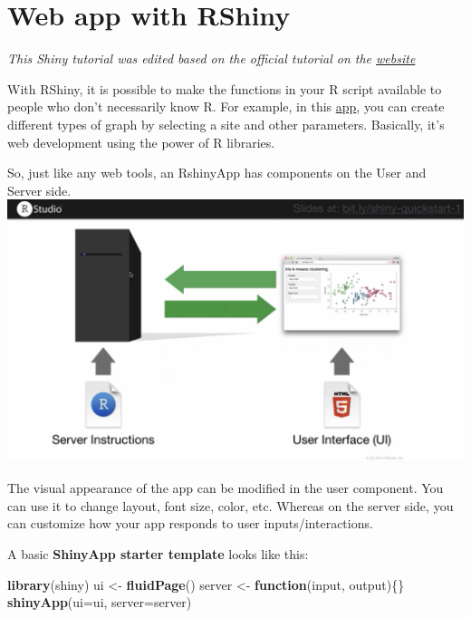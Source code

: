 \documentclass[
]{book}
\newenvironment{Shaded}{\begin{snugshade}}{\end{snugshade}}
\newcommand{\ControlFlowTok}[1]{\textcolor[rgb]{0.13,0.29,0.53}{\textbf{#1}}}
\newcommand{\DataTypeTok}[1]{\textcolor[rgb]{0.13,0.29,0.53}{#1}}
\newcommand{\KeywordTok}[1]{\textcolor[rgb]{0.13,0.29,0.53}{\textbf{#1}}}
\newcommand{\NormalTok}[1]{#1}
\newcommand{\StringTok}[1]{\textcolor[rgb]{0.31,0.60,0.02}{#1}}
\begin{document}
\hypertarget{htmlwidget-03897aacea723c0335c0}{}

\hypertarget{web-app-with-rshiny}{%
\section{Web app with RShiny}\label{web-app-with-rshiny}}

\emph{This Shiny tutorial was edited based on the official tutorial on the \href{https://shiny.rstudio.com/tutorial/}{website}}

With RShiny, it is possible to make the functions in your R script available to people who don't necessarily know R. For example, in this \href{https://udwq.shinyapps.io/lakeprofiledashboard/}{app}, you can create different types of graph by selecting a site and other parameters. Basically, it's web development using the power of R libraries.

So, just like any web tools, an RshinyApp has components on the User and Server side.
\includegraphics{images/appStructure.png}

The visual appearance of the app can be modified in the user component. You can use it to change layout, font size, color, etc. Whereas on the server side, you can customize how your app responds to user inputs/interactions.

A basic \textbf{ShinyApp starter template} looks like this:

\begin{Shaded}
\begin{Highlighting}[]
\KeywordTok{library}\NormalTok{(shiny)}
\NormalTok{ui \textless{}{-}}\StringTok{ }\KeywordTok{fluidPage}\NormalTok{()}
\NormalTok{server \textless{}{-}}\StringTok{ }\ControlFlowTok{function}\NormalTok{(input, output)\{\}}
\KeywordTok{shinyApp}\NormalTok{(}\DataTypeTok{ui=}\NormalTok{ui, }\DataTypeTok{server=}\NormalTok{server)}
\end{Highlighting}
\end{Shaded}
\end{document}
